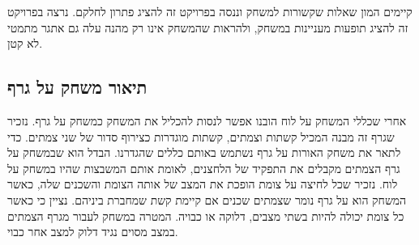 \documentclass[12pt,leqno]{article}
\theoremstyle{theoremdd}
\begin{document}
קיימים המון שאלות שקשורות למשחק וננסה בפרויקט זה להציג פתרון לחלקם.
נרצה בפרויקט זה להציג תופעות מעניינות במשחק, ולהראות
שהמשחק אינו רק מהנה עלה גם אתגר מתמטי לא קטן.

\subsection{תיאור משחק על גרף}
אחרי שכללי המשחק על לוח הובנו אפשר לנסות להכליל את המשחק כמשחק על גרף.
נזכיר שגרף זה מבנה המכיל קשתות וצמתים, קשתות מוגדרות כצירוף סדור של שני צמתים.
כדי לתאר את משחק האורות על גרף נשתמש באותם כללים שהגדרנו.
הבדל הוא שבמשחק על גרף הצמתים מקבלים את התפקיד של הלחצנים, לאומת אותם המשבצות שהיו במשחק על לוח.
נזכיר שכל לחיצה על צומת הופכת את המצב של אותה הצומת והשכנים שלה,
כאשר המשחק הוא על גרף נומר שצמתים שכנים אם קיימת
קשת שמחברת ביניהם.
נציין כי כאשר כל צומת יכולה להיות בשתי מצבים,
דלוקה או כבויה.
המטרה במשחק לעבור מגרף הצמתים במצב מסוים נגיד דלוק למצב אחר כבוי.
\end{document}
